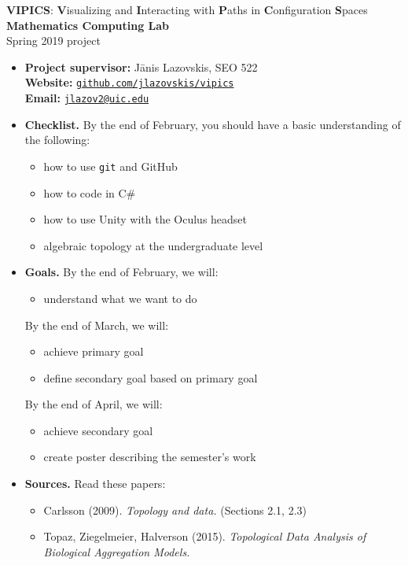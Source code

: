 \documentclass[10pt]{article}
\begin{document}
\def\vspacing{\vspace{.5cm}}

\noindent

\begin{center}
\large \textbf{VIPICS}: \textbf{V}isualizing and \textbf{I}nteracting with \textbf{P}aths in \textbf{C}onfiguration \textbf{S}paces
\\[5pt]\normalsize \textbf{Mathematics Computing Lab} \\
Spring 2019 project
\end{center}

\vspacing
 
\begin{itemize}
\item \textbf{Project supervisor:} J\=anis Lazovskis, SEO 522 \\
\textbf{Website:} \href{https://github.com/jlazovskis/vipics}{\texttt{github.com/jlazovskis/vipics}} \\
\textbf{Email:}  \href{mailto:jlazov2@uic.edu}{\nolinkurl{jlazov2@uic.edu}}

\vspacing

\item \textbf{Checklist.}  By the end of February, you should have a basic understanding of the following:
\begin{itemize}
\item how to use \texttt{git} and GitHub
\item how to code in C\#
\item how to use Unity with the Oculus headset
\item algebraic topology at the undergraduate level
\end{itemize}

\vspacing

\item \textbf{Goals.} By the end of February, we will:
\begin{itemize}
\item understand what we want to do
\end{itemize}
By the end of March, we will:
\begin{itemize}
\item achieve primary goal
\item define secondary goal based on primary goal
\end{itemize}
By the end of April, we will:
\begin{itemize}
\item achieve secondary goal
\item create poster describing the semester's work
\end{itemize}

\vspacing

\item \textbf{Sources.} Read these papers:
\begin{itemize}
\item Carlsson (2009). \textit{Topology and data.} (Sections 2.1, 2.3)
\item Topaz, Ziegelmeier, Halverson (2015). \textit{Topological Data Analysis of Biological Aggregation Models.}
\end{itemize}

\end{itemize}
\end{document}
